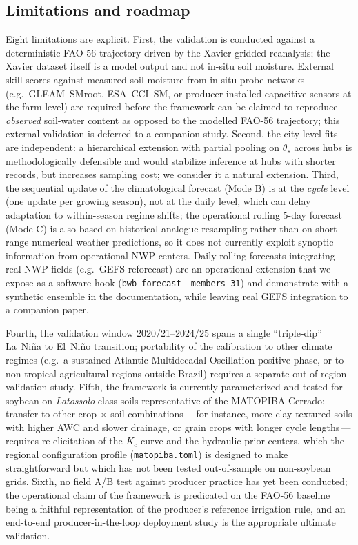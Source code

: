 \documentclass[review,5p,times]{elsarticle}
\begin{document}
\subsection{Limitations and roadmap}\label{sec:discussion_limits}

Eight limitations are explicit. First, the validation is conducted
against a deterministic FAO-56 trajectory driven by the Xavier
gridded reanalysis; the Xavier dataset itself is a model output and
not in-situ soil moisture. External skill scores against measured
soil moisture from in-situ probe networks (e.g.~GLEAM~SMroot,
ESA~CCI~SM, or producer-installed capacitive sensors at the farm
level) are required before the framework can be claimed to
reproduce \emph{observed} soil-water content as opposed to the
modelled FAO-56 trajectory; this external validation is deferred
to a companion study. Second, the city-level fits are independent:
a hierarchical extension with partial pooling on $\theta_s$ across
hubs is methodologically defensible and would stabilize inference at
hubs with shorter records, but increases sampling cost; we consider
it a natural extension. Third, the sequential update of the
climatological forecast (Mode B) is at the \emph{cycle} level (one
update per growing season), not at the daily level, which can delay
adaptation to within-season regime shifts; the operational rolling
5-day forecast (Mode C) is also based on historical-analogue
resampling rather than on short-range numerical weather predictions,
so it does not currently exploit synoptic information from
operational NWP centers. Daily rolling forecasts integrating real
NWP fields (e.g.\ GEFS reforecast) are an operational extension that
we expose as a software hook
(\texttt{bwb forecast --members 31}) and demonstrate with a
synthetic ensemble in the documentation, while leaving real GEFS
integration to a companion paper.

Fourth, the validation window 2020/21--2024/25 spans a single
``triple-dip'' La~Ni\~na to El~Ni\~no transition; portability of the
calibration to other climate regimes (e.g.\ a sustained Atlantic
Multidecadal Oscillation positive phase, or to non-tropical
agricultural regions outside Brazil) requires a separate
out-of-region validation study. Fifth, the framework is currently
parameterized and tested for soybean on \textit{Latossolo}-class
soils representative of the MATOPIBA Cerrado; transfer to other
crop $\times$ soil combinations\,---\,for instance, more
clay-textured soils with higher AWC and slower drainage, or grain
crops with longer cycle lengths\,---\,requires re-elicitation of the
$K_c$ curve and the hydraulic prior centers, which the regional
configuration profile (\texttt{matopiba.toml}) is designed to make
straightforward but which has not been tested out-of-sample on
non-soybean grids. Sixth, no field A/B test against producer
practice has yet been conducted; the operational claim of the
framework is predicated on the FAO-56 baseline being a faithful
representation of the producer's reference irrigation rule, and an
end-to-end producer-in-the-loop deployment study is the appropriate
ultimate validation.
\end{document}
